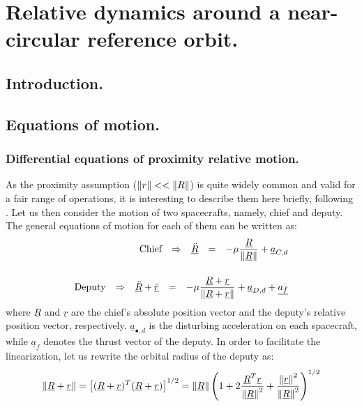 \chapter{Relative dynamics around a near-circular reference orbit.}
%
\label{chap: HCW}
%
\section{Introduction.}
%
%
\section{Equations of motion.}
%
%
	\subsection{Differential equations of proximity relative motion.} \label{sec: Diff_eqs_prox}
	\indent As the proximity assumption ($\mbox{$\left\lVert r \right\rVert$} <<\mbox{$\left\lVert R \right\rVert$}$) is quite widely common and valid for a fair range of operations, it is interesting to describe them here briefly, following \cite{Yamanaka_Ankersen}. Let us then consider the motion of two spacecrafts, namely, chief and deputy. The general equations of motion for each of them can be written as:
	\begin{align}
	\label{eqCh2:	chief_eq}
	\begin{array}{ccccc}
	\text{Chief} 		& \Rightarrow & \underline{\ddot{R}} & = & - \mu \dfrac{\underline{R}}{\mbox{$\left\lVert \underline{R} \right\rVert$}} + \underline{a}_{C, d} 
	\end{array}  \\[1.2em]
	\label{eqCh2:	deputy_eq}
	\begin{array}{ccccc}
	\text{Deputy} 	& \Rightarrow & \underline{\ddot{R}} + \underline{\ddot{r}} & = & - \mu \dfrac{\underline{R} + \underline{r}}{\mbox{$\left\lVert \underline{R} + \underline{r} \right\rVert$}} + \underline{a}_{D, d} + \underline{a_f}\end{array}  
	\end{align}
	\noindent where $\underline{R}$ and $\underline{r}$ are the chief's absolute position vector and the deputy's relative position vector, respectively. $\underline{a}_{\bullet, d}$ is the disturbing acceleration on each spacecraft, while $\underline{a}_f$ denotes the thrust vector of the deputy. In order to facilitate the linearization, let us rewrite the orbital radius of the deputy as:
	\[
	\mbox{$\left\lVert \underline{R} + \underline{r} \right\rVert$} = \left[ (\underline{R} + \underline{r})^T (\underline{R} + \underline{r}) \right]^{1/2} = \mbox{$\left\lVert \underline{R} \right\rVert$} \left( 1 + 2 \dfrac{\underline{R}^T \underline{r}}{\mbox{$\left\lVert \underline{R} \right\rVert$}^2} + \dfrac{\mbox{$\left\lVert \underline{r} \right\rVert$}^2}{\mbox{$\left\lVert \underline{R} \right\rVert$}^2} \right)^{1/2}
	\]
